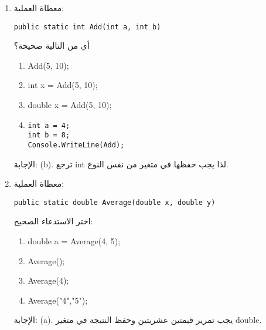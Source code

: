 \documentclass[14pt]{extarticle}
\begin{document}
\begin{enumerate}[itemsep=1.8em]
\clearpage
\item
معطاة العملية:
\begin{english}
\begin{verbatim}
public static int Add(int a, int b)
\end{verbatim}
\end{english}
أي من التالية صحيحة؟
\begin{english}
\begin{enumerate}[label=(\alph*)]
    \item Add(5, 10);
    \item int x = Add(5, 10);
    \item double x = Add(5, 10);
    \item \begin{verbatim}
int a = 4;
int b = 8;
Console.WriteLine(Add);
\end{verbatim}
\end{enumerate}
\end{english}
\ifwithsols
\begin{boxSolution}
الإجابة: (b).
ترجع int لذا يجب حفظها في متغير من نفس النوع.
\end{boxSolution}
\fi


\item
معطاة العملية:
\begin{english}
\begin{verbatim}
public static double Average(double x, double y)
\end{verbatim}
\end{english}
اختر الاستدعاء الصحيح:
\begin{english}
\begin{enumerate}[label=(\alph*)]
    \item double a = Average(4, 5);
    \item Average();
    \item Average(4);
    \item Average("4","5");
\end{enumerate}
\end{english}
\ifwithsols
\begin{boxSolution}
الإجابة: (a).
يجب تمرير قيمتين عشريتين وحفظ النتيجة في متغير double.
\end{boxSolution}
\fi



\end{enumerate}
\end{document}
